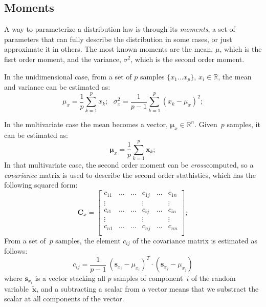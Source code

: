 \subsection{Moments}
A way to parameterize a distribution law is through its \textit{moments}, a set of parameters that can fully describe the distribution in some cases, or just approximate it in others. The most known moments are the mean, $\mu$, which is the fisrt order moment, and the variance, $\sigma^2$, which is the second order moment.

In the unidimensional case, from a set of $p$ samples $\{x_1\dots x_p\}$, $x_i \in\mathbb{R}$, the mean and variance can be estimated as:
\begin{equation}
 \mu_x = \frac{1}{p}\sum^p_{k=1} x_k;\ \ \ \sigma^2_x = \frac{1}{p-1}\sum^p_{k=1} (x_k-\mu_x)^2;
\end{equation}

In the multivariate case the mean becomes a vector, $\boldsymbol\mu_x\in\mathbb{R}^n$. Given~$p$ samples, it can be estimated as:
\begin{equation}
 \boldsymbol\mu_x = \frac{1}{p}\sum^p_{k=1} \mathbf{x}_k;
\end{equation}
In that multivariate case, the second order moment can be \textit{cross}computed, so a \textit{covariance} matrix is used to describe the second order stathistics, which has the following squared form: 
\begin{equation}
 \mathbf{C}_x = 
 \left[
 \begin{array}{cccccc}
  c_{11} & \dots & \dots & c_{1j} & \dots & c_{1n} \\
  \vdots &       &       & \vdots &       & \vdots \\
  c_{i1} & \dots & \dots & c_{ij} & \dots & c_{in} \\
  \vdots &       &       & \vdots &       & \vdots \\
  c_{n1} & \dots & \dots & c_{nj} & \dots & c_{nn} \\
 \end{array}
 \right];
\end{equation}
From a set of~$p$ samples, the element $c_{ij}$ of the covariance matrix is estimated as follows: 
\begin{equation}
 c_{ij} = \frac{1}{p-1}\ (\mathbf{s}_{x_i}-\mu_{x_i})^T \cdot (\mathbf{s}_{x_j}-\mu_{x_j})
\end{equation}
where $\mathbf{s}_{x_i}$ is a vector stacking all $p$ samples of component~$i$ of the random variable~$\tilde{\mathbf{x}}$, and a subtracting a scalar from a vector means that we substract the scalar at all components of the vector. 


